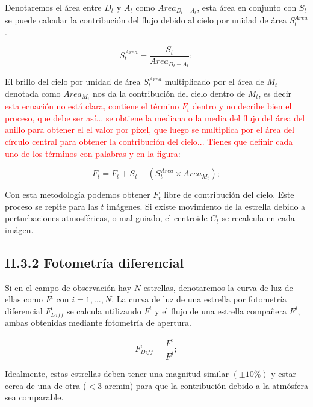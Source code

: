 Denotaremos el área entre $D_{t}$ y $A_{t}$ como $Area_{D_{t}-A_{t}}$, esta área en conjunto con $S_{t}$ se puede calcular la contribución del flujo debido al cielo por unidad de área $S^{Area}_{t}$.

\begin{equation}
  \displaystyle S^{Area}_{t} = \dfrac{S_{t}}{Area_{D_{t}-A_{t}}};
\end{equation}

El brillo del cielo por unidad de área $S^{Area}_{t}$ multiplicado por el área de $M_{t}$ denotada como $Area_{M_{t}}$	nos da la contribución del cielo dentro de $M_{t}$, es decir \textcolor{red}{esta ecuación no está clara, contiene el término $F_t$ dentro y no decribe bien el proceso, que debe ser así... se obtiene la mediana o la media del flujo del área del anillo para obtener el el valor por pixel, que luego se multiplica por el área del círculo central para obtener la contribución del cielo... Tienes que definir cada uno de los términos con palabras y en la figura}:

\begin{equation}
  \displaystyle F_{t} = F_{t} + S_{t} - \left( S^{Area}_{t}\times Area_{M_{t}}\right);
\end{equation}

Con esta metodología podemos obtener $F_{t}$ libre de contribución del cielo. Este proceso se repite para las $t$ imágenes. Si existe movimiento de la estrella debido a perturbaciones atmosféricas, o mal guiado, el centroide $ C_{t} $ se recalcula en cada imágen.


\subsection*{II.3.2 Fotometría diferencial}

Si en el campo de observación hay $ N $ estrellas, denotaremos la curva de luz de ellas como $F^{i}$ con $i=1,...,N$. La curva de luz de una estrella por fotometría diferencial $F^{i}_{Diff}$ se calcula utilizando $F^{i}$ y el flujo de una estrella compañera $F^{j}$, ambas obtenidas mediante fotometría de apertura. 

\begin{equation}
  \displaystyle F^{i}_{Diff}=\dfrac{F^{i}}{F^{j}};
\end{equation}

Idealmente, estas estrellas deben tener una magnitud similar $(\pm 10 \%)$ y estar cerca de una de otra ($<3$ arcmin) para que la contribución debido a la atmósfera sea comparable.


